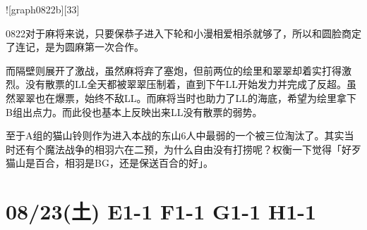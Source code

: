 
![graph0822b][33]

0822对于麻将来说，只要保恭子进入下轮和小漫相爱相杀就够了，所以和圆脸商定了连记，是为圆麻第一次合作。

而隔壁则展开了激战，虽然麻将弃了塞炮，但前两位的绘里和翠翠却着实打得激烈。没有散票的LL全天都被翠翠压制着，直到下午LL开始发力并完成了反超。虽然翠翠也在爆票，始终不敌LL。而麻将当时也助力了LL的海底，希望为绘里拿下B组出点力。而此役也基本上反映出来LL没有散票的弱势。

至于A组的猫山铃则作为进入本战的东山6人中最弱的一个被三位淘汰了。其实当时还有个魔法战争的相羽六在二预，为什么自由没有打捞呢？权衡一下觉得「好歹猫山是百合，相羽是BG，还是保送百合的好」。

\section{08/23(土) E1-1 F1-1 G1-1 H1-1}

